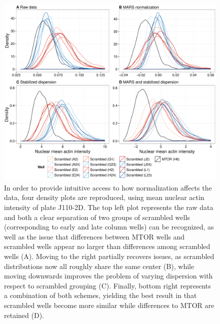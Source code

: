 \begin{knitrout}
\color{fgcolor}\begin{figure}

{\centering \includegraphics[width=\maxwidth]{figures/R/normalization-data-actin-normalization-1} 

}

\caption[Effects of normalization schemes visualized through density plots.]{In order to provide intuitive access to how normalization affects the data, four density plots are reproduced, using mean nuclear actin intensity of plate J110-2D. The top left plot represents the raw data and both a clear separation of two groups of scrambled wells (corresponding to early and late column wells) can be recognized, as well as the issue that differences between MTOR wells and scrambled wells appear no larger than differences among scrambled wells (A). Moving to the right partially recovers issues, as scrambled distributions now all roughly share the same center (B), while moving downwards improves the problem of varying dispersion with respect to scrambled grouping (C). Finally, bottom right represents a combination of both schemes, yielding the best result in that scrambled wells become more similar while differences to MTOR are retained (D).}\label{fig:data-actin-normalization}
\end{figure}


\end{knitrout}
